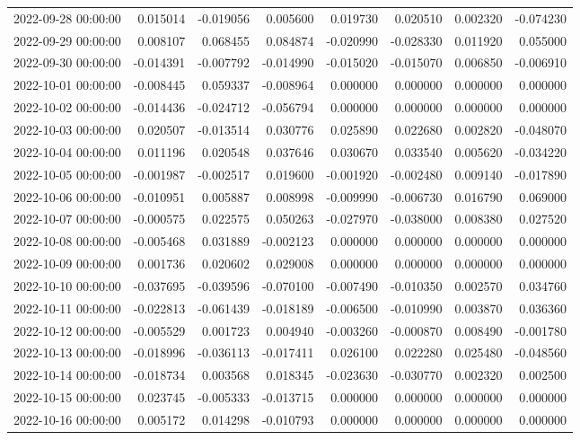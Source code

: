 \begin{tabular}{lrrrrrrr}
2022-09-28 00:00:00 & 0.015014 & -0.019056 & 0.005600 & 0.019730 & 0.020510 & 0.002320 & -0.074230 \\
2022-09-29 00:00:00 & 0.008107 & 0.068455 & 0.084874 & -0.020990 & -0.028330 & 0.011920 & 0.055000 \\
2022-09-30 00:00:00 & -0.014391 & -0.007792 & -0.014990 & -0.015020 & -0.015070 & 0.006850 & -0.006910 \\
2022-10-01 00:00:00 & -0.008445 & 0.059337 & -0.008964 & 0.000000 & 0.000000 & 0.000000 & 0.000000 \\
2022-10-02 00:00:00 & -0.014436 & -0.024712 & -0.056794 & 0.000000 & 0.000000 & 0.000000 & 0.000000 \\
2022-10-03 00:00:00 & 0.020507 & -0.013514 & 0.030776 & 0.025890 & 0.022680 & 0.002820 & -0.048070 \\
2022-10-04 00:00:00 & 0.011196 & 0.020548 & 0.037646 & 0.030670 & 0.033540 & 0.005620 & -0.034220 \\
2022-10-05 00:00:00 & -0.001987 & -0.002517 & 0.019600 & -0.001920 & -0.002480 & 0.009140 & -0.017890 \\
2022-10-06 00:00:00 & -0.010951 & 0.005887 & 0.008998 & -0.009990 & -0.006730 & 0.016790 & 0.069000 \\
2022-10-07 00:00:00 & -0.000575 & 0.022575 & 0.050263 & -0.027970 & -0.038000 & 0.008380 & 0.027520 \\
2022-10-08 00:00:00 & -0.005468 & 0.031889 & -0.002123 & 0.000000 & 0.000000 & 0.000000 & 0.000000 \\
2022-10-09 00:00:00 & 0.001736 & 0.020602 & 0.029008 & 0.000000 & 0.000000 & 0.000000 & 0.000000 \\
2022-10-10 00:00:00 & -0.037695 & -0.039596 & -0.070100 & -0.007490 & -0.010350 & 0.002570 & 0.034760 \\
2022-10-11 00:00:00 & -0.022813 & -0.061439 & -0.018189 & -0.006500 & -0.010990 & 0.003870 & 0.036360 \\
2022-10-12 00:00:00 & -0.005529 & 0.001723 & 0.004940 & -0.003260 & -0.000870 & 0.008490 & -0.001780 \\
2022-10-13 00:00:00 & -0.018996 & -0.036113 & -0.017411 & 0.026100 & 0.022280 & 0.025480 & -0.048560 \\
2022-10-14 00:00:00 & -0.018734 & 0.003568 & 0.018345 & -0.023630 & -0.030770 & 0.002320 & 0.002500 \\
2022-10-15 00:00:00 & 0.023745 & -0.005333 & -0.013715 & 0.000000 & 0.000000 & 0.000000 & 0.000000 \\
2022-10-16 00:00:00 & 0.005172 & 0.014298 & -0.010793 & 0.000000 & 0.000000 & 0.000000 & 0.000000 \\

\end{tabular}

